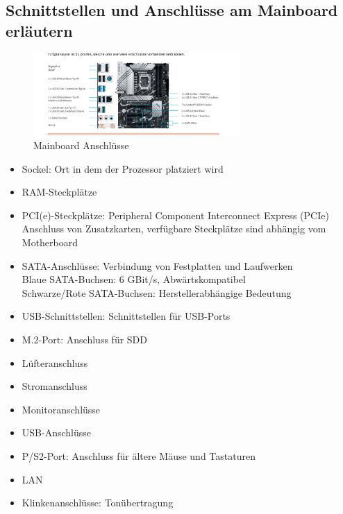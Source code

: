 \subsection{Schnittstellen und Anschlüsse am Mainboard erläutern}
    \begin{figure}[ht]
        \centering
        \includegraphics[width=0.7\textwidth]{./images/2.4.5_anschluesse.png}
        \caption{Mainboard Anschlüsse}\label{fig:Mainboard Anschlüsse}
    \end{figure}

    \begin{tcolorbox}[width=15cm, center, title=Anschlüsse am Mainboard, coltitle=white, colframe=orange, colback=white!60!orange]
        \begin{itemize}[itemsep=0.1em, parsep=0.3em]
            \item Sockel\@: Ort in dem der Prozessor platziert wird
            \item RAM-Steckplätze
            \item PCI(e)-Steckplätze\@: Peripheral Component Interconnect Express (PCIe) \\ Anschluss von Zusatzkarten, verfügbare Steckplätze sind abhängig vom Motherboard
            \item SATA-Anschlüsse\@: Verbindung von Festplatten und Laufwerken \\ Blaue SATA-Buchsen: 6 GBit/s, Abwärtskompatibel \\ Schwarze/Rote SATA-Buchsen: Herstellerabhängige Bedeutung
            \item USB-Schnittstellen\@: Schnittstellen für USB-Ports
            \item M.2-Port\@: Anschluss für SDD
            \item Lüfteranschluss
            \item Stromanschluss
            \item Monitoranschlüsse
            \item USB-Anschlüsse
            \item P/S2-Port\@: Anschluss für ältere Mäuse und Tastaturen
            \item LAN
            \item Klinkenanschlüsse\@: Tonübertragung
        \end{itemize}
    \end{tcolorbox}

